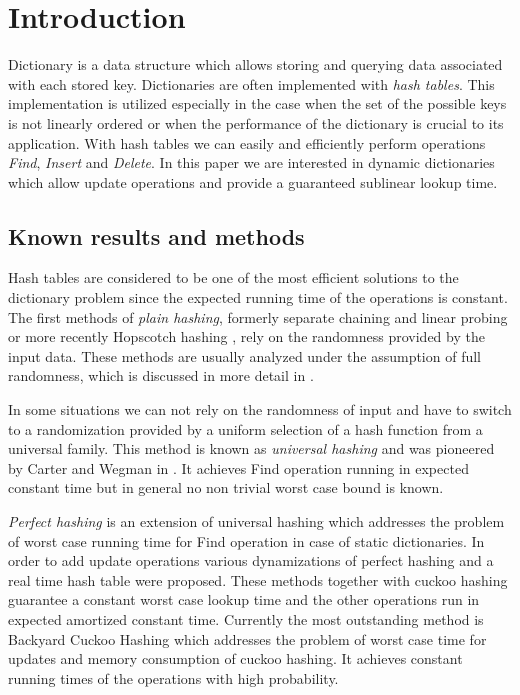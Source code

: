 \section{Introduction}
Dictionary is a data structure which allows storing and querying data associated with each stored key. 
Dictionaries are often implemented with \emph{hash tables}. 
This implementation is utilized especially in the case when the set of the possible keys is not linearly ordered or when the performance of the dictionary is crucial to its application.
With hash tables we can easily and efficiently perform operations \emph{Find}, \emph{Insert} and \emph{Delete}.
In this paper we are interested in dynamic dictionaries which allow update operations and provide a guaranteed sublinear lookup time.

\subsection{Known results and methods}
Hash tables are considered to be one of the most efficient solutions to the dictionary problem since the expected running time of the operations is constant.
The first methods of \emph{plain hashing}, formerly separate chaining and linear probing or more recently Hopscotch hashing \cite{DBLP:conf/wdag/HerlihyST08}, rely on the randomness provided by the input data. 
These methods are usually analyzed under the assumption of full randomness, which is discussed in more detail in \cite{DBLP:books/sp/Mehlhorn84}.

In some situations we can not rely on the randomness of input and have to switch to a randomization provided by a uniform selection of a hash function from a universal family.
This method is known as \emph{universal hashing} and was pioneered by Carter and Wegman in \cite{DBLP:journals/jcss/CarterW79}.
It achieves Find operation running in expected constant time but in general no non trivial worst case bound is known.

\emph{Perfect hashing} \cite{Fredman:1984:SST:828.1884} is an extension of universal hashing which addresses the problem of worst case running time for Find operation in case of static dictionaries. 
In order to add update operations various dynamizations of perfect hashing \cite{DBLP:journals/siamcomp/DietzfelbingerKMHRT94} and a real time hash table \cite{DBLP:conf/icalp/DietzfelbingerH90} were proposed. 
These methods together with cuckoo hashing \cite{DBLP:conf/esa/PaghR01} guarantee a constant worst case lookup time and the other operations run in expected amortized constant time.
Currently the most outstanding method is Backyard Cuckoo Hashing \cite{DBLP:conf/focs/ArbitmanNS10} which addresses the problem of worst case time for updates and memory consumption of cuckoo hashing.
It achieves constant running times of the operations with high probability.

